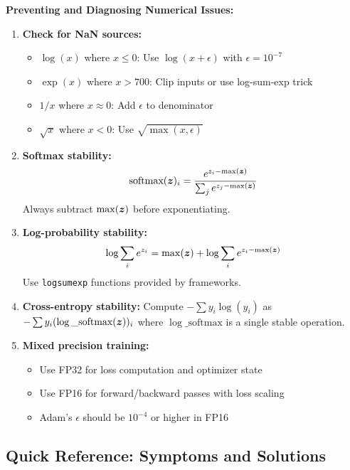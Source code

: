 \documentclass[../../main.tex]{subfiles}
\begin{document}
\begin{important}
\textbf{Preventing and Diagnosing Numerical Issues:}

\begin{enumerate}
    \item \textbf{Check for NaN sources:}
    \begin{itemize}
        \item $\log(x)$ where $x \leq 0$: Use $\log(x + \epsilon)$ with $\epsilon = 10^{-7}$
        \item $\exp(x)$ where $x > 700$: Clip inputs or use log-sum-exp trick
        \item $1/x$ where $x \approx 0$: Add $\epsilon$ to denominator
        \item $\sqrt{x}$ where $x < 0$: Use $\sqrt{\max(x, \epsilon)}$
    \end{itemize}

    \item \textbf{Softmax stability:}
    \[
        \text{softmax}(\boldsymbol{z})_i = \frac{e^{z_i - \max(\boldsymbol{z})}}{\sum_j e^{z_j - \max(\boldsymbol{z})}}
    \]
    Always subtract $\max(\boldsymbol{z})$ before exponentiating.

    \item \textbf{Log-probability stability:}
    \[
        \log \sum_i e^{z_i} = \max(\boldsymbol{z}) + \log \sum_i e^{z_i - \max(\boldsymbol{z})}
    \]
    Use \texttt{logsumexp} functions provided by frameworks.

    \item \textbf{Cross-entropy stability:}
    Compute $-\sum y_i \log(\hat{y}_i)$ as $-\sum y_i (\log\_\text{softmax}(\boldsymbol{z}))_i$ where $\log\_\text{softmax}$ is a single stable operation.

    \item \textbf{Mixed precision training:}
    \begin{itemize}
        \item Use FP32 for loss computation and optimizer state
        \item Use FP16 for forward/backward passes with loss scaling
        \item Adam's $\epsilon$ should be $10^{-4}$ or higher in FP16
    \end{itemize}
\end{enumerate}
\end{important}

\subsection{Quick Reference: Symptoms and Solutions}
\end{document}
